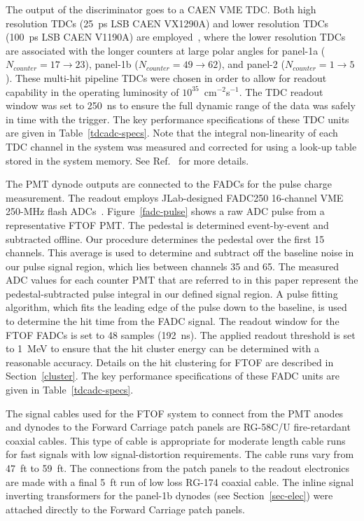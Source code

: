\documentclass{elsart}
\begin{document}
The output of the discriminator goes to a CAEN VME TDC. Both high resolution TDCs (25~ps LSB CAEN
VX1290A) and lower resolution TDCs (100~ps LSB CAEN V1190A) are employed~\cite{tdc-manual}, where
the lower resolution TDCs are associated with the longer counters at large polar angles for panel-1a
($N_{counter}=17 \to 23$), panel-1b ($N_{counter}=49 \to 62$), and panel-2 ($N_{counter}=1 \to 5$). These
multi-hit pipeline TDCs were chosen in order to allow for readout capability in the operating luminosity of
$10^{35}$~cm$^{-2}$s$^{-1}$. The TDC readout window was set to 250~ns to ensure the full dynamic range
of the data was safely in time with the trigger. The key performance specifications of these TDC units are
given in Table~\ref{tdcadc-specs}. Note that the integral non-linearity of each TDC channel in the system
was measured and corrected for using a look-up table stored in the system memory. See Ref.~\cite{daq-nim}
for more details.

The PMT dynode outputs are connected to the FADCs for the pulse charge measurement. The readout
employs JLab-designed FADC250 16-channel VME 250-MHz flash ADCs~\cite{fadc-manual}. 
Figure~\ref{fadc-pulse} shows a raw ADC pulse from a representative FTOF PMT. The pedestal is determined
event-by-event and subtracted offline. Our procedure determines the pedestal over the first 15 channels. This
average is used to determine and subtract off the baseline noise in our pulse signal region, which lies between
channels 35 and 65. The measured ADC values for each counter PMT that are referred to in this paper represent
the pedestal-subtracted pulse integral in our defined signal region. A pulse fitting algorithm, which fits the leading
edge of the pulse down to the baseline, is used to determine the hit time from the FADC signal. The readout window
for the FTOF FADCs is set to 48 samples (192~ns). The applied readout threshold is set to 1~MeV to ensure that
the hit cluster energy can be determined with a reasonable accuracy. Details on the hit clustering for FTOF are
described in Section~\ref{cluster}. The key performance specifications of these FADC units are given in
Table~\ref{tdcadc-specs}.

The signal cables used for the FTOF system to connect from the PMT anodes and dynodes to the Forward
Carriage patch panels are RG-58C/U fire-retardant coaxial cables. This type of cable is appropriate for
moderate length cable runs for fast signals with low signal-distortion requirements. The cable runs vary
from 47~ft to 59~ft. The connections from the patch panels to the readout electronics are made with a
final 5~ft run of low loss RG-174 coaxial cable. The inline signal inverting transformers for the panel-1b
dynodes (see Section~\ref{sec-elec}) were attached directly to the Forward Carriage patch panels.
\end{document}
